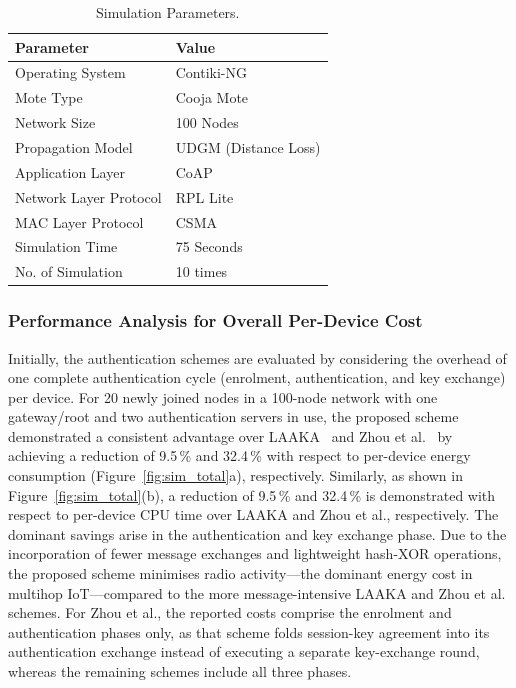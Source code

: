 \documentclass[conference]{IEEEtran}
\makeatletter
\newcommand{\onelinetablecaption}{%
  \long\def\@makecaption##1##2{%
    \footnotesize\bgroup\par\centering\@IEEEtabletopskipstrut
    \setbox\@tempboxa\hbox{%
      \normalfont\footnotesize ##1\quad\scshape ##2}%
    \ifdim\wd\@tempboxa>\hsize
      \parbox{\hsize}{\centering\normalfont\footnotesize ##1\quad\scshape ##2}%
    \else
      \box\@tempboxa
    \fi
    \par
    \addvspace{0.5\baselineskip}\egroup
    \@IEEEtablecaptionsepspace}}
\makeatother
\begin{document}
\begin{table}[!t]
  \centering
  \onelinetablecaption
  \caption{Simulation Parameters.}
  \label{tab:simparams}
  \scriptsize
  \setlength{\tabcolsep}{4pt}
  \begin{tabular}{ll}
    \toprule
    Parameter & Value \\
    \midrule
    Operating System       & Contiki-NG \\
    Mote Type              & Cooja Mote \\
    Network Size           & 100 Nodes \\
    Propagation Model      & UDGM (Distance Loss) \\
    Application Layer      & CoAP \\
    Network Layer Protocol & RPL Lite \\
    MAC Layer Protocol     & CSMA \\
    Simulation Time        & 75 Seconds \\
    No. of Simulation      & 10 times \\
    \bottomrule
  \end{tabular}
\end{table}

\subsubsection{Performance Analysis for Overall Per-Device Cost}

Initially, the authentication schemes are evaluated by considering the overhead of one
complete authentication cycle (enrolment, authentication, and key exchange) per device.
For 20 newly joined nodes in a 100-node network with one gateway/root and two
authentication servers in use, the proposed scheme demonstrated a consistent advantage
over LAAKA~\cite{ali2024laaka} and Zhou et al.~\cite{zhou2024auth} by achieving a reduction of
9.5\,\% and 32.4\,\% with respect to per-device energy consumption
(Figure~\ref{fig:sim_total}a), respectively. Similarly, as shown in
Figure~\ref{fig:sim_total}(b), a reduction of 9.5\,\% and 32.4\,\% is demonstrated with
respect to per-device CPU time over LAAKA and Zhou et al., respectively. The dominant savings
arise in the authentication and key exchange phase. Due to the incorporation of fewer
message exchanges and lightweight hash-XOR operations, the proposed
scheme minimises radio activity---the dominant energy cost in multihop IoT---compared to the
more message-intensive LAAKA and Zhou et al. schemes. For Zhou et al., the
reported costs comprise the enrolment and authentication phases only, as that scheme
folds session-key agreement into its authentication exchange instead of executing a
separate key-exchange round, whereas the remaining schemes include all three phases.
\end{document}
